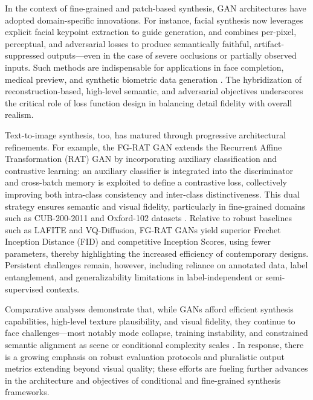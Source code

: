 In the context of fine-grained and patch-based synthesis, GAN architectures have adopted domain-specific innovations. For instance, facial synthesis now leverages explicit facial keypoint extraction to guide generation, and combines per-pixel, perceptual, and adversarial losses to produce semantically faithful, artifact-suppressed outputs---even in the case of severe occlusions or partially observed inputs. Such methods are indispensable for applications in face completion, medical preview, and synthetic biometric data generation \cite{ref97}. The hybridization of reconstruction-based, high-level semantic, and adversarial objectives underscores the critical role of loss function design in balancing detail fidelity with overall realism.

Text-to-image synthesis, too, has matured through progressive architectural refinements. For example, the FG-RAT GAN extends the Recurrent Affine Transformation (RAT) GAN by incorporating auxiliary classification and contrastive learning: an auxiliary classifier is integrated into the discriminator and cross-batch memory is exploited to define a contrastive loss, collectively improving both intra-class consistency and inter-class distinctiveness. This dual strategy ensures semantic and visual fidelity, particularly in fine-grained domains such as CUB-200-2011 and Oxford-102 datasets \cite{ref101}. Relative to robust baselines such as LAFITE and VQ-Diffusion, FG-RAT GANs yield superior Frechet Inception Distance (FID) and competitive Inception Scores, using fewer parameters, thereby highlighting the increased efficiency of contemporary designs. Persistent challenges remain, however, including reliance on annotated data, label entanglement, and generalizability limitations in label-independent or semi-supervised contexts.

Comparative analyses demonstrate that, while GANs afford efficient synthesis capabilities, high-level texture plausibility, and visual fidelity, they continue to face challenges---most notably mode collapse, training instability, and constrained semantic alignment as scene or conditional complexity scales \cite{ref93,ref95,ref101}. In response, there is a growing emphasis on robust evaluation protocols and pluralistic output metrics extending beyond visual quality; these efforts are fueling further advances in the architecture and objectives of conditional and fine-grained synthesis frameworks.

